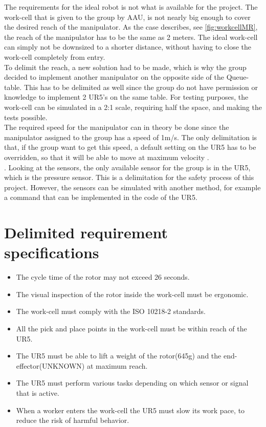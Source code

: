 The requirements for the ideal robot is not what is available for the project. 
The work-cell that is given to the group by AAU, is not nearly big enough to cover the desired reach of the manipulator. As the case describes, see \ref{fig:workcellMR}, the reach of the manipulator has to be the same as 2 meters. The ideal work-cell can simply not be downsized to a shorter distance, without having to close the work-cell completely from entry.\\
To delimit the reach, a new solution had to be made, which is why the group decided to implement another manipulator on the opposite side of the Queue-table. This has to be delimited as well since the group do not have permission or knowledge to implement 2 UR5's on the same table.
For testing purposes, the work-cell can be simulated in a 2:1 scale, requiring half the space, and making the tests possible. \\
The required speed for the manipulator can in theory be done since the manipulator assigned to the group has a speed of 1m/s. The only delimitation is that, if the group want to get this speed, a default setting on the UR5 has to be overridden, so that it will be able to move at maximum velocity \cite{UserManual}.\\.
Looking at the sensors, the only available sensor for the group is in the UR5, which is the pressure sensor. This is a delimitation for the safety process of this project. However, the sensors can be simulated with another method, for example a command that can be implemented in the code of the UR5.\\

\section{Delimited requirement specifications}

\begin{itemize}
    \item The cycle time of the rotor may not exceed 26 seconds.
    \item The visual inspection of the rotor inside the work-cell must be ergonomic.
    \item The work-cell must comply with the ISO 10218-2 standards.
    \item All the pick and place points in the work-cell must be within reach of the UR5.
    \item The UR5 must be able to lift a weight of the rotor(645g) and the end-effector(UNKNOWN) at maximum reach.
    \item The UR5 must perform various tasks depending on which sensor or signal that is active.
    \item When a worker enters the work-cell the UR5 must slow its work pace, to reduce the risk of harmful behavior.
\end{itemize}